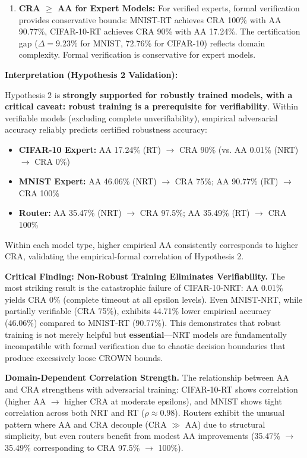 \documentclass[11pt,a4paper]{article}
\begin{document}
\begin{enumerate}
    \item \textbf{CRA $\geq$ AA for Expert Models:} For verified experts, formal verification provides conservative bounds: MNIST-RT achieves CRA 100\% with AA 90.77\%, CIFAR-10-RT achieves CRA 90\% with AA 17.24\%. The certification gap ($\Delta = 9.23\%$ for MNIST, $72.76\%$ for CIFAR-10) reflects domain complexity. Formal verification is conservative for expert models.
\end{enumerate}

\textbf{Interpretation (Hypothesis 2 Validation):}

Hypothesis 2 is \textbf{strongly supported for robustly trained models, with a critical caveat: robust training is a prerequisite for verifiability}. Within verifiable models (excluding complete unverifiability), empirical adversarial accuracy reliably predicts certified robustness accuracy:

\begin{itemize}
    \item \textbf{CIFAR-10 Expert:} AA 17.24\% (RT) $\to$ CRA 90\% (vs. AA 0.01\% (NRT) $\to$ CRA 0\%)
    \item \textbf{MNIST Expert:} AA 46.06\% (NRT) $\to$ CRA 75\%; AA 90.77\% (RT) $\to$ CRA 100\%
    \item \textbf{Router:} AA 35.47\% (NRT) $\to$ CRA 97.5\%; AA 35.49\% (RT) $\to$ CRA 100\%
\end{itemize}

Within each model type, higher empirical AA consistently corresponds to higher CRA, validating the empirical-formal correlation of Hypothesis 2.

\textbf{Critical Finding: Non-Robust Training Eliminates Verifiability.} The most striking result is the catastrophic failure of CIFAR-10-NRT: AA 0.01\% yields CRA 0\% (complete timeout at all epsilon levels). Even MNIST-NRT, while partially verifiable (CRA 75\%), exhibits 44.71\% lower empirical accuracy (46.06\%) compared to MNIST-RT (90.77\%). This demonstrates that robust training is not merely helpful but \textbf{essential}—NRT models are fundamentally incompatible with formal verification due to chaotic decision boundaries that produce excessively loose CROWN bounds.

\textbf{Domain-Dependent Correlation Strength.} The relationship between AA and CRA strengthens with adversarial training: CIFAR-10-RT shows correlation (higher AA $\to$ higher CRA at moderate epsilons), and MNIST shows tight correlation across both NRT and RT ($\rho \approx 0.98$). Routers exhibit the unusual pattern where AA and CRA decouple (CRA $\gg$ AA) due to structural simplicity, but even routers benefit from modest AA improvements (35.47\% $\to$ 35.49\% corresponding to CRA 97.5\% $\to$ 100\%).
\end{document}

